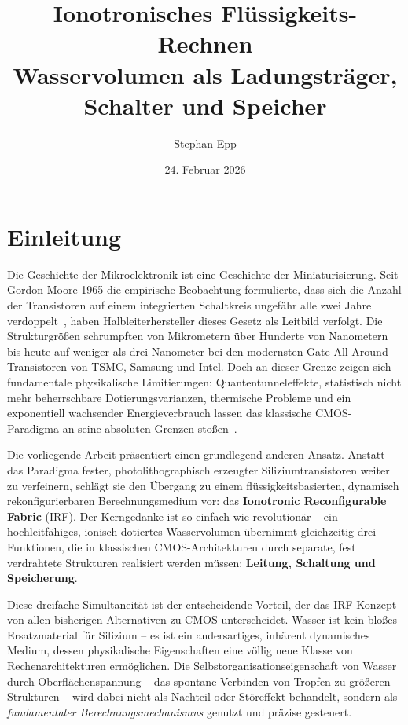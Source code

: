 ﻿\documentclass[a4paper,12pt]{scrreprt}
\title{\textbf{Ionotronisches Flüssigkeits-Rechnen}\\
	\large Wasservolumen als Ladungsträger, Schalter und Speicher}
\author{Stephan Epp}
\date{24. Februar 2026}
\theoremstyle{definition}
\begin{document}
	
\maketitle
\tableofcontents
\newpage

\section{Einleitung}

Die Geschichte der Mikroelektronik ist eine Geschichte der Miniaturisierung.
Seit Gordon Moore 1965 die empirische Beobachtung formulierte, dass sich die
Anzahl der Transistoren auf einem integrierten Schaltkreis ungefähr alle zwei
Jahre verdoppelt~\cite{moore1965}, haben Halbleiterhersteller dieses Gesetz
als Leitbild verfolgt. Die Strukturgrößen schrumpften von Mikrometern über
Hunderte von Nanometern bis heute auf weniger als drei Nanometer bei den
modernsten Gate-All-Around-Transistoren von TSMC, Samsung und Intel. Doch
an dieser Grenze zeigen sich fundamentale physikalische Limitierungen:
Quantentunneleffekte, statistisch nicht mehr beherrschbare Dotierungsvarianzen,
thermische Probleme und ein exponentiell wachsender Energieverbrauch lassen
das klassische CMOS-Paradigma an seine absoluten Grenzen stoßen~\cite{theis2017}.

Die vorliegende Arbeit präsentiert einen grundlegend anderen Ansatz. Anstatt
das Paradigma fester, photolithographisch erzeugter Siliziumtransistoren
weiter zu verfeinern, schlägt sie den Übergang zu einem flüssigkeitsbasierten,
dynamisch rekonfigurierbaren Berechnungsmedium vor: das \textbf{Ionotronic
	Reconfigurable Fabric} (IRF). Der Kerngedanke ist so einfach wie revolutionär --
ein hochleitfähiges, ionisch dotiertes Wasservolumen übernimmt gleichzeitig
drei Funktionen, die in klassischen CMOS-Architekturen durch separate,
fest verdrahtete Strukturen realisiert werden müssen: \textbf{Leitung,
	Schaltung und Speicherung}.

Diese dreifache Simultaneität ist der entscheidende Vorteil, der das IRF-Konzept
von allen bisherigen Alternativen zu CMOS unterscheidet. Wasser ist kein bloßes
Ersatzmaterial für Silizium -- es ist ein andersartiges, inhärent dynamisches
Medium, dessen physikalische Eigenschaften eine völlig neue Klasse von
Rechenarchitekturen ermöglichen. Die Selbstorganisationseigenschaft von
Wasser durch Oberflächenspannung -- das spontane Verbinden von Tropfen zu
größeren Strukturen -- wird dabei nicht als Nachteil oder Störeffekt behandelt,
sondern als \emph{fundamentaler Berechnungsmechanismus} genutzt und
präzise gesteuert.
\end{document}
